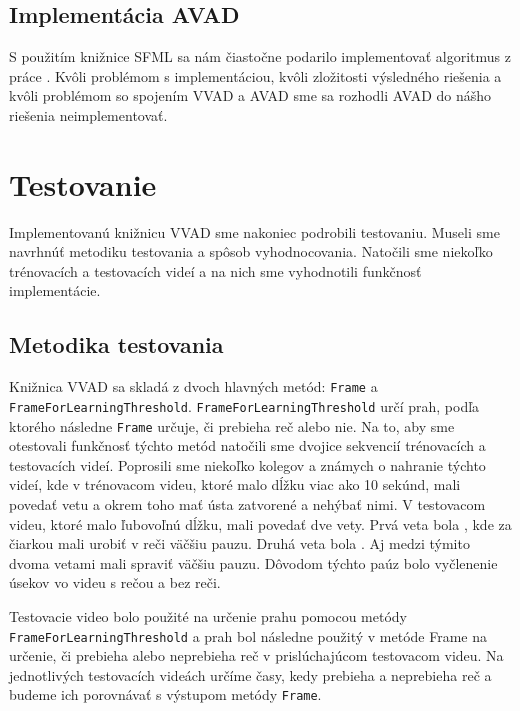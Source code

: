 \section{Implementácia AVAD}
S použitím knižnice SFML \cite{SFML} sa nám čiastočne podarilo implementovať algoritmus z práce  \cite{moattar2009simple}. 
Kvôli problémom s implementáciou, kvôli zložitosti výsledného riešenia a kvôli problémom so spojením VVAD a AVAD sme sa rozhodli AVAD do nášho riešenia neimplementovať.

\chapter{Testovanie}
Implementovanú knižnicu VVAD sme nakoniec podrobili testovaniu.
Museli sme navrhnúť metodiku testovania a spôsob vyhodnocovania. 
Natočili sme niekoľko tré\-no\-va\-cích a testovacích videí a na nich sme vyhodnotili funkčnosť implementácie. 

\section{Metodika testovania}\label{metodika}
Knižnica VVAD sa skladá z dvoch hlavných metód: \texttt{Frame} a \texttt{Fra\-me\-For\-Lear\-ning\-Threshold}. 
\texttt{Fra\-me\-For\-Lear\-ning\-Threshold} určí prah, podľa ktorého následne \texttt{Frame} určuje, či prebieha reč alebo nie.
Na to, aby sme otestovali funkčnosť týchto metód natočili sme dvojice sekvencií trénovacích a testovacích videí. 
Poprosili sme niekoľko kolegov a známych  o nahranie týchto videí, kde v trénovacom videu, ktoré malo dĺžku viac ako 10 sekúnd, mali povedať vetu  a okrem toho mať ústa zatvorené a nehýbať nimi.
V testovacom videu, ktoré malo ľubovoľnú dĺžku, mali povedať dve vety. Prvá veta bola , kde za čiarkou mali urobiť v reči väčšiu pauzu. 
Druhá veta bola . 
Aj medzi týmito dvoma vetami mali spraviť väčšiu pauzu. 
Dôvodom týchto paúz bolo vyčlenenie úsekov vo videu s rečou a bez reči.

Testovacie video bolo použité na určenie prahu pomocou metódy \texttt{Fra\-me\-For\-Lear\-ning\-Threshold} a prah bol následne použitý v metóde Frame na určenie, či prebieha alebo neprebieha reč v prislúchajúcom testovacom videu. 
Na jednotlivých testovacích videách určíme časy, kedy prebieha a neprebieha reč a budeme ich porovnávať s výstupom metódy \texttt{Frame}.

